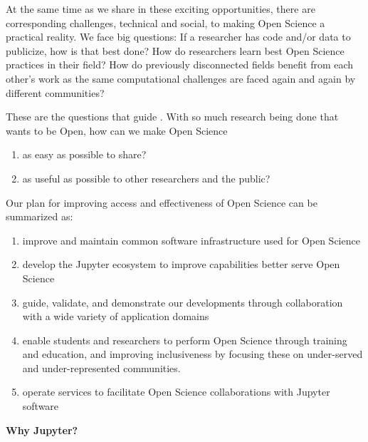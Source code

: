 At the same time as we share in these exciting opportunities,
there are corresponding challenges, technical and social,
to making Open Science a practical reality.
We face big questions: If a researcher has code and/or data to publicize, how is that best done?
How do researchers learn best Open Science practices in their field?
How do previously disconnected fields benefit from each other's work as the same computational challenges are faced again and again by different communities?

These are the questions that guide \TheProject.
With so much research being done that wants to be Open,
how can we make Open Science

\begin{enumerate}
    \item as easy as possible to share?
    \item as useful as possible to other researchers and the public?
\end{enumerate}

Our plan for improving access and effectiveness of Open Science can be summarized as:

\begin{enumerate}
    \item improve and maintain common software infrastructure used for Open Science
    \item develop the Jupyter ecosystem to improve capabilities better serve Open Science
    \item guide, validate, and demonstrate our developments through collaboration
          with a wide variety of application domains
    \item enable students and researchers to perform Open Science through
          training and education,
          and improving inclusiveness by focusing these on under-served
          and under-represented communities.
    \item operate services to facilitate Open Science collaborations
          with Jupyter software
\end{enumerate}

\textbf{Why Jupyter?}

